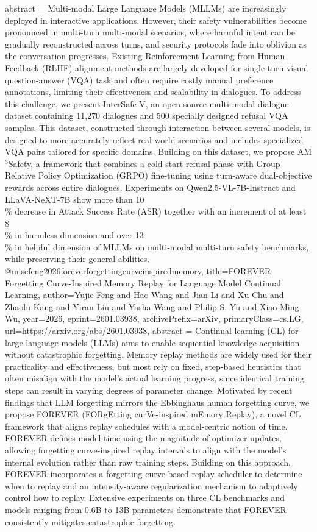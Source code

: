 {      abstract = {Multi-modal Large Language Models (MLLMs) are increasingly deployed in interactive applications. However, their safety vulnerabilities become pronounced in multi-turn multi-modal scenarios, where harmful intent can be gradually reconstructed across turns, and security protocols fade into oblivion as the conversation progresses. Existing Reinforcement Learning from Human Feedback (RLHF) alignment methods are largely developed for single-turn visual question-answer (VQA) task and often require costly manual preference annotations, limiting their effectiveness and scalability in dialogues. To address this challenge, we present InterSafe-V, an open-source multi-modal dialogue dataset containing 11,270 dialogues and 500 specially designed refusal VQA samples. This dataset, constructed through interaction between several models, is designed to more accurately reflect real-world scenarios and includes specialized VQA pairs tailored for specific domains. Building on this dataset, we propose AM$^3$Safety, a framework that combines a cold-start refusal phase with Group Relative Policy Optimization (GRPO) fine-tuning using turn-aware dual-objective rewards across entire dialogues. Experiments on Qwen2.5-VL-7B-Instruct and LLaVA-NeXT-7B show more than 10\\\% decrease in Attack Success Rate (ASR) together with an increment of at least 8\\\% in harmless dimension and over 13\\\% in helpful dimension of MLLMs on multi-modal multi-turn safety benchmarks, while preserving their general abilities.}
}@misc{feng2026foreverforgettingcurveinspiredmemory,
      title={FOREVER: Forgetting Curve-Inspired Memory Replay for Language Model Continual Learning}, 
      author={Yujie Feng and Hao Wang and Jian Li and Xu Chu and Zhaolu Kang and Yiran Liu and Yasha Wang and Philip S. Yu and Xiao-Ming Wu},
      year={2026},
      eprint={2601.03938},
      archivePrefix={arXiv},
      primaryClass={cs.LG},
      url={https://arxiv.org/abs/2601.03938},
      abstract = {Continual learning (CL) for large language models (LLMs) aims to enable sequential knowledge acquisition without catastrophic forgetting. Memory replay methods are widely used for their practicality and effectiveness, but most rely on fixed, step-based heuristics that often misalign with the model's actual learning progress, since identical training steps can result in varying degrees of parameter change. Motivated by recent findings that LLM forgetting mirrors the Ebbinghaus human forgetting curve, we propose FOREVER (FORgEtting curVe-inspired mEmory Replay), a novel CL framework that aligns replay schedules with a model-centric notion of time. FOREVER defines model time using the magnitude of optimizer updates, allowing forgetting curve-inspired replay intervals to align with the model's internal evolution rather than raw training steps. Building on this approach, FOREVER incorporates a forgetting curve-based replay scheduler to determine when to replay and an intensity-aware regularization mechanism to adaptively control how to replay. Extensive experiments on three CL benchmarks and models ranging from 0.6B to 13B parameters demonstrate that FOREVER consistently mitigates catastrophic forgetting.}
}
